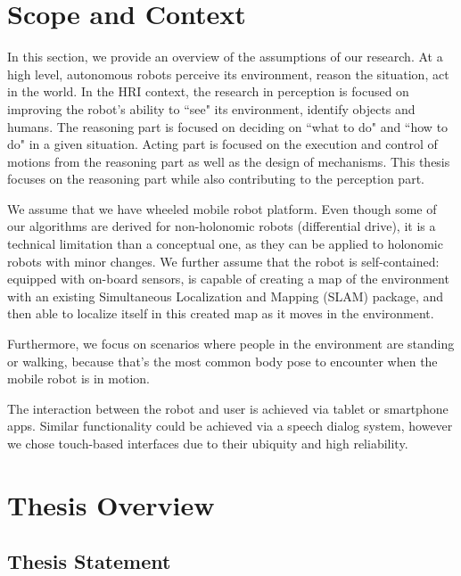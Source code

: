 
\section{Scope and Context}

In this section, we provide an overview of the assumptions of our research.  At a high level, autonomous robots perceive its environment, reason the situation, act in the world. In the HRI context, the research in perception is focused on improving the robot's ability to ``see" its environment, identify objects and humans. The reasoning part is focused on deciding on ``what to do" and ``how to do" in a given situation. Acting part is focused on the execution and control of motions from the reasoning part as well as the design of mechanisms. This thesis focuses on the reasoning part while also contributing to the perception part.

We assume that we have wheeled mobile robot platform. Even though some of our algorithms are derived for non-holonomic robots (differential drive), it is a technical limitation than a conceptual one, as they can be applied to holonomic robots with minor changes. We further assume that the robot is self-contained: equipped with on-board sensors, is capable of creating a map of the environment with an existing Simultaneous Localization and Mapping (SLAM) package, and then able to localize itself in this created map as it moves in the environment.

Furthermore, we focus on scenarios where people in the environment are standing or walking, because that's the most common body pose to encounter when the mobile robot is in motion.

The interaction between the robot and user is achieved via tablet or smartphone apps. Similar functionality could be achieved via a speech dialog system, however we chose touch-based interfaces due to their ubiquity and high reliability.

\section{Thesis Overview}
\subsection{Thesis Statement}


